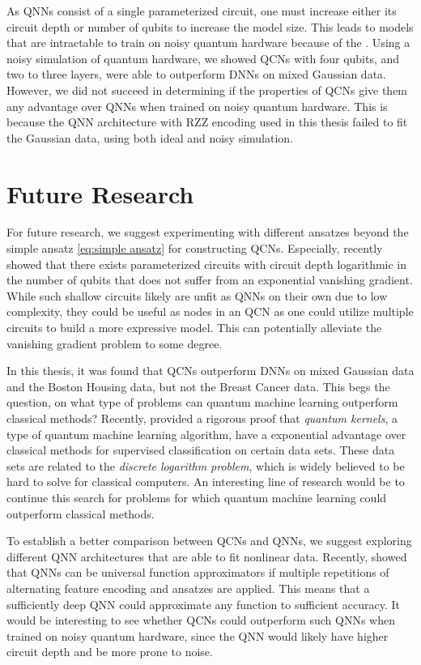 As QNNs consist of a single parameterized circuit, one must increase either its circuit depth or number of qubits to increase the model size. This leads to models that are intractable to train on noisy quantum hardware because of the . Using a noisy simulation of quantum hardware, we showed QCNs with four qubits, and two to three layers, were able to outperform DNNs on mixed Gaussian data. However, we did not succeed in determining if the properties of QCNs give them any advantage over QNNs when trained on noisy quantum hardware. This is because the QNN architecture with RZZ encoding used in this thesis failed to fit the Gaussian data, using both ideal and noisy simulation. 


\section{Future Research}\label{sec:future}
For future research, we suggest experimenting with different ansatzes beyond the simple ansatz \cref{eq:simple ansatz} for constructing QCNs. Especially, \citet{Cerezo_2021} recently showed that there exists parameterized circuits with circuit depth logarithmic in the number of qubits that does not suffer from an exponential vanishing gradient. While such shallow circuits likely are unfit as QNNs on their own due to low complexity, they could be useful as nodes in an QCN as one could utilize multiple circuits to build a more expressive model. This can potentially alleviate the vanishing gradient problem to some degree.

In this thesis, it was found that QCNs outperform DNNs on mixed Gaussian data and the Boston Housing data, but not the Breast Cancer data. This begs the question, on what type of problems can quantum machine learning outperform classical methods? Recently, \citet{Liu_2021} provided a rigorous proof that \emph{quantum kernels}, a type of quantum machine learning algorithm, have a exponential advantage over classical methods for supervised classification on certain data sets. These data sets are related to the \emph{discrete logarithm problem}, which is widely believed to be hard to solve for classical computers. An interesting line of research would be to continue this search for problems for which quantum machine learning could outperform classical methods. 

To establish a better comparison between QCNs and QNNs, we suggest exploring different QNN architectures that are able to fit nonlinear data. Recently, \citet{Schuld_2021} showed that QNNs can be universal function approximators if multiple repetitions of alternating feature encoding and ansatzes are applied. This means that a sufficiently deep QNN could approximate any function to sufficient accuracy. It would be interesting to see whether QCNs could outperform such QNNs when trained on noisy quantum hardware, since the QNN would likely have higher circuit depth and be more prone to noise.

